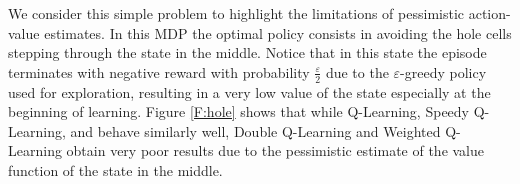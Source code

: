 \documentclass[conference]{IEEEtran}
\begin{document}
We consider this simple problem to highlight the limitations of pessimistic action-value estimates. In this MDP the optimal policy consists in avoiding the hole cells stepping through the state in the middle. Notice that in this state the episode terminates with negative reward with probability $\frac{\varepsilon}{2}$ due to the $\varepsilon$-greedy policy used for exploration, resulting in a very low value of the state especially at the beginning of learning. Figure \ref{F:hole} shows that while Q-Learning, Speedy Q-Learning, and \alg behave similarly well, Double Q-Learning and Weighted Q-Learning obtain very poor results due to the pessimistic estimate of the value function of the state in the middle.
\begin{figure}[t]
\begin{minipage}{\columnwidth}
\centering
  \hspace{-.5cm}

\end{minipage}
\end{figure}
\end{document}
